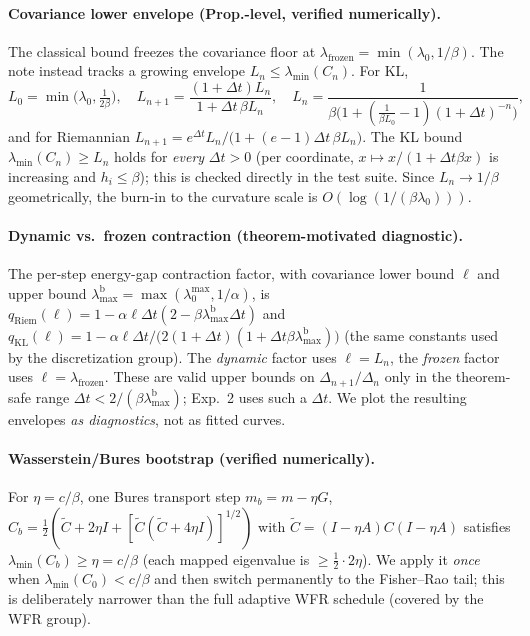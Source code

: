 \documentclass[11pt]{article}
\newcommand{\Delt}{\Delta t}
\newcommand{\lammin}{\lambda_{\min}}
\newcommand{\lammax}{\lambda_{\max}}
\begin{document}
\paragraph{Covariance lower envelope (Prop.-level, verified numerically).}
The classical bound freezes the covariance floor at
$\lambda_{\mathrm{frozen}}=\min(\lambda_0,1/\beta)$. The note instead tracks a
growing envelope $L_n\le\lammin(C_n)$. For KL,
\begin{equation}
\label{eq:kl-env}
L_0=\min\!\big(\lambda_0,\tfrac1{2\beta}\big),\quad
L_{n+1}=\frac{(1+\Delt)L_n}{1+\Delt\,\beta L_n},\quad
L_n=\frac1{\beta\big(1+(\tfrac1{\beta L_0}-1)(1+\Delt)^{-n}\big)},
\end{equation}
and for Riemannian
$L_{n+1}=e^{\Delt}L_n/\big(1+(e-1)\Delt\,\beta L_n\big)$. The KL bound
$\lammin(C_n)\ge L_n$ holds for \emph{every} $\Delt>0$ (per coordinate,
$x\mapsto x/(1+\Delt\beta x)$ is increasing and $h_i\le\beta$); this is checked
directly in the test suite. Since $L_n\to1/\beta$ geometrically, the burn-in to
the curvature scale is $O(\log(1/(\beta\lambda_0)))$.

\paragraph{Dynamic vs.\ frozen contraction (theorem-motivated diagnostic).}
The per-step energy-gap contraction factor, with covariance lower bound
$\ell$ and upper bound $\lammax^{\mathrm b}=\max(\lambda_0^{\max},1/\alpha)$, is
$q_{\mathrm{Riem}}(\ell)=1-\alpha\ell\Delt(2-\beta\lammax^{\mathrm b}\Delt)$ and
$q_{\mathrm{KL}}(\ell)=1-\alpha\ell\Delt/\big(2(1+\Delt)(1+\Delt\beta
\lammax^{\mathrm b})\big)$ (the same constants used by the discretization group).
The \emph{dynamic} factor uses $\ell=L_n$, the \emph{frozen} factor uses
$\ell=\lambda_{\mathrm{frozen}}$. These are valid upper bounds on
$\Delta_{n+1}/\Delta_n$ only in the theorem-safe range
$\Delt<2/(\beta\lammax^{\mathrm b})$; Exp.~2 uses such a $\Delt$. We plot the
resulting envelopes \emph{as diagnostics}, not as fitted curves.

\paragraph{Wasserstein/Bures bootstrap (verified numerically).}
For $\eta=c/\beta$, one Bures transport step
$m_b=m-\eta G$, $C_b=\tfrac12(\tilde C+2\eta I+[\tilde C(\tilde C+4\eta I)]^{1/2})$
with $\tilde C=(I-\eta A)C(I-\eta A)$ satisfies $\lammin(C_b)\ge\eta=c/\beta$
(each mapped eigenvalue is $\ge\tfrac12\cdot2\eta$). We apply it \emph{once} when
$\lammin(C_0)<c/\beta$ and then switch permanently to the Fisher--Rao tail; this
is deliberately narrower than the full adaptive WFR schedule (covered by the WFR
group).
\end{document}
